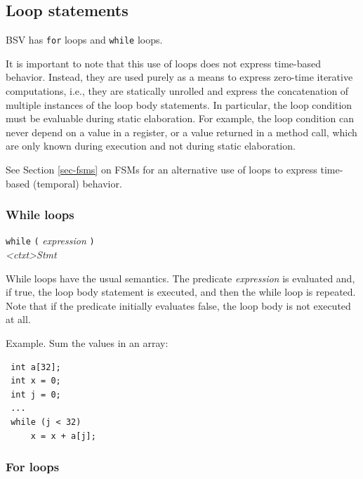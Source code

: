 \documentclass[twoside,letterpaper]{article}
\newcommand{\hm}{\hspace*{1em}}
\newcommand{\hmm}{\hspace*{2em}}
\newcommand{\BSV}{BSV}
\newcommand{\nterm}[1]{\emph{#1}}
\newcommand{\term}[1]{\texttt{#1}}
\newcommand{\gram}[2]{    \hm\makebox[10em][l]{\it #1}\makebox[1.5em][l]{::=}    #2}
\newcommand{\grammore}[1]{\hm\makebox[10em][l]{      }\makebox[1.5em][l]{}       #1}
\begin{document}
\subsection{Loop statements}

\label{sec-loop-stmts}


{\BSV} has \texttt{for} loops and \texttt{while} loops.

It is important to note that this use of loops does not express
time-based behavior.  Instead, they are used purely as a means to
express zero-time iterative computations, i.e., they are statically
unrolled and express the concatenation of multiple instances of the
loop body statements.  In particular, the loop condition must be
evaluable during static elaboration.  For example, the loop condition
can never depend on a value in a register, or a value returned in a
method call, which are only known during execution and not during
static elaboration.

See Section \ref{sec-fsms} on FSMs for an alternative use of loops to
express time-based (temporal) behavior.


\subsubsection{While loops}

\label{sec-while-loops}

\gram{<ctxt>While}{ \term{while} \term{(} \nterm{expression} \term{)} } \\
\grammore         { \hmm \nterm{<ctxt>Stmt} }

While loops have the usual semantics. The predicate \nterm{expression}
is evaluated and, if true, the loop body statement is executed, and
then the while loop is repeated.  Note that if the predicate initially
evaluates false, the loop body is not executed at all.

Example.  Sum the values in an array:
\begin{verbatim}
 int a[32];
 int x = 0;
 int j = 0;
 ...
 while (j < 32)
     x = x + a[j];
\end{verbatim}


\subsubsection{For loops}
\end{document}
